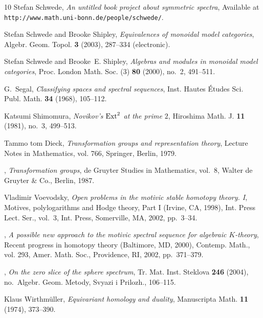 \documentclass{amsart}
\theoremstyle{definition}
\theoremstyle{remark}
\begin{document}
\begin{thebibliography}{10}
Stefan Schwede, \emph{An untitled book project about symmetric spectra},
  Available at \verb|http://www.math.uni-bonn.de/people/schwede/|.

Stefan Schwede and Brooke Shipley, \emph{Equivalences of monoidal model
  categories}, Algebr. Geom. Topol. \textbf{3} (2003), 287--334 (electronic).

Stefan Schwede and Brooke~E. Shipley, \emph{Algebras and modules in monoidal
  model categories}, Proc. London Math. Soc. (3) \textbf{80} (2000), no.~2,
  491--511. 

G.~Segal, \emph{Classifying spaces and spectral sequences}, Inst. Hautes
  \'Etudes Sci. Publ. Math. \textbf{34} (1968), 105--112.

Katsumi Shimomura, \emph{Novikov's {${\rm Ext}\sp{2}$} at the prime {$2$}},
  Hiroshima Math. J. \textbf{11} (1981), no.~3, 499--513. 

Tammo tom Dieck, \emph{Transformation groups and representation theory},
  Lecture Notes in Mathematics, vol. 766, Springer, Berlin, 1979. 

\bysame, \emph{Transformation groups}, de Gruyter Studies in Mathematics,
  vol.~8, Walter de Gruyter \& Co., Berlin, 1987. 

Vladimir Voevodsky, \emph{Open problems in the motivic stable homotopy theory.
  {I}}, Motives, polylogarithms and {H}odge theory, {P}art {I} ({I}rvine, {CA},
  1998), Int. Press Lect. Ser., vol.~3, Int. Press, Somerville, MA, 2002,
  pp.~3--34. 

\bysame, \emph{A possible new approach to the motivic spectral sequence for
  algebraic {$K$}-theory}, Recent progress in homotopy theory ({B}altimore,
  {MD}, 2000), Contemp. Math., vol. 293, Amer. Math. Soc., Providence, RI,
  2002, pp.~371--379. 

\bysame, \emph{On the zero slice of the sphere spectrum}, Tr. Mat. Inst.
  Steklova \textbf{246} (2004), no.~Algebr. Geom. Metody, Svyazi i Prilozh.,
  106--115. 

Klaus Wirthm{\"u}ller, \emph{Equivariant homology and duality}, Manuscripta
  Math. \textbf{11} (1974), 373--390. 

\end{thebibliography}
\end{document}
